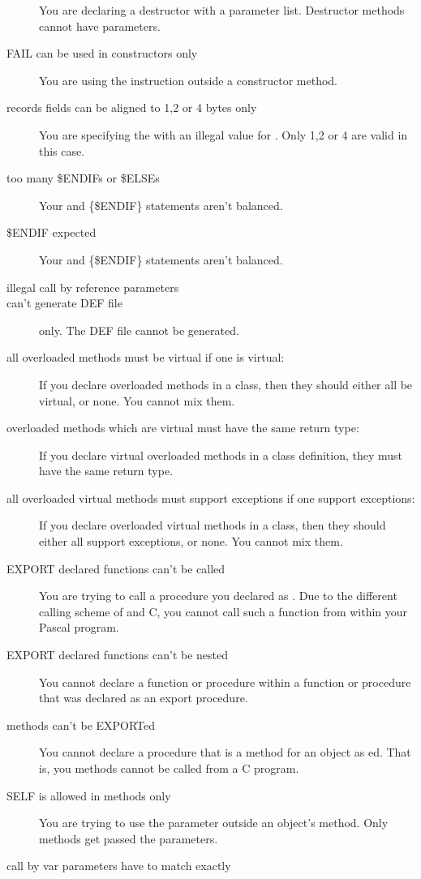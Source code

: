 \documentclass{report}
\begin{document}
\begin{description}
You are declaring a destructor with a parameter list. Destructor methods
cannot have parameters.
\item [FAIL can be used in constructors only]
You are using the  instruction outside a constructor method.
\item [records fields can be aligned to 1,2 or 4 bytes only]
You are specifying the  with an illegal value for
. Only 1,2 or 4 are valid in this case.
\item [too many \$ENDIFs or \$ELSEs]
Your  and {\{\$ENDIF\}} statements aren't balanced.
\item [\$ENDIF expected]
Your  and {\{\$ENDIF\}} statements aren't balanced.
\item [illegal call by reference parameters]
\item [can't generate DEF file]
\ostwo only. The DEF file cannot be generated.
\item [all overloaded methods must be virtual if one is virtual:]
If you declare overloaded methods in a class, then they should either all be
virtual, or none. You cannot mix them.
\item [overloaded methods which are virtual must have the same return type:]
If you declare virtual overloaded methods in a class definition, they must
have the same return type.
\item [all overloaded virtual methods must support exceptions if one support exceptions:]
If you declare overloaded virtual methods in a class, then they should either 
all support exceptions, or none. You cannot mix them.
\item [EXPORT declared functions can't be called]
You are trying to call a procedure you declared as . Due to the
different calling scheme of \fpk and C, you cannot call such a function from
within your Pascal program. 
\item [EXPORT declared functions can't be nested]
You cannot declare a function or procedure within a function or procedure
that was declared as an export procedure.
\item [methods can't be EXPORTed]
You cannot declare a procedure that is a method for an object as
ed. That is, you methods cannot be called from a C program.
\item [SELF is allowed in methods only]
You are trying to use the  parameter outside an object's method.
Only methods get passed the  parameters.
\item [call by var parameters have to match exactly]

\end{description}
\end{document}
